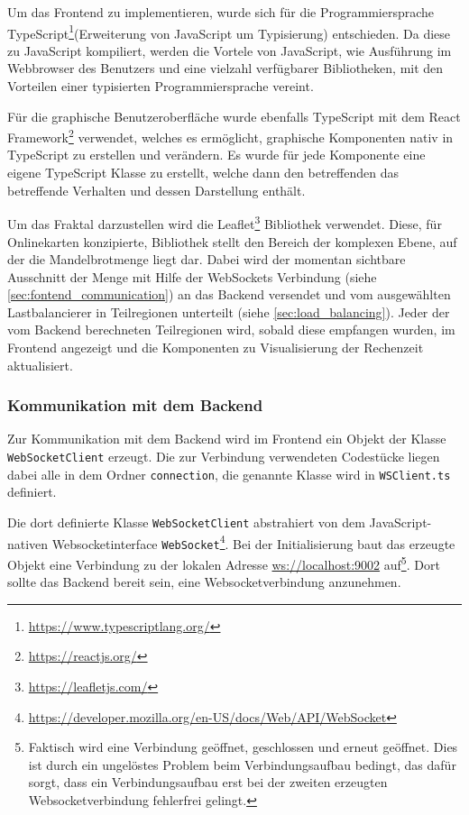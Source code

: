 Um das Frontend zu implementieren, wurde sich für die Programmiersprache TypeScript\footnote{\url{https://www.typescriptlang.org/}}(Erweiterung von JavaScript um Typisierung) entschieden.
Da diese zu JavaScript kompiliert, werden die Vortele von JavaScript, wie Ausführung im Webbrowser des Benutzers und eine vielzahl verfügbarer Bibliotheken,
mit den Vorteilen einer typisierten Programmiersprache vereint.

Für die graphische Benutzeroberfläche wurde ebenfalls TypeScript mit dem React Framework\footnote{\url{https://reactjs.org/}} verwendet, welches es ermöglicht,
graphische Komponenten nativ in TypeScript zu erstellen und verändern.
Es wurde für jede Komponente eine eigene TypeScript Klasse zu erstellt, welche dann den betreffenden
das betreffende Verhalten und dessen Darstellung enthält.

Um das Fraktal darzustellen wird die Leaflet\footnote{\url{https://leafletjs.com/}} Bibliothek verwendet.
Diese, für Onlinekarten konzipierte, Bibliothek stellt den Bereich der komplexen Ebene, auf der die Mandelbrotmenge liegt dar.
Dabei wird der momentan sichtbare Ausschnitt der Menge mit Hilfe der WebSockets Verbindung (siehe \autoref{sec:fontend_communication}) an das Backend versendet und vom ausgewählten Lastbalancierer in Teilregionen unterteilt (siehe \autoref{sec:load_balancing}).
Jeder der vom Backend berechneten Teilregionen wird, sobald diese empfangen wurden, im Frontend angezeigt und die Komponenten
zu Visualisierung der Rechenzeit aktualisiert.

\subsubsection{Kommunikation mit dem Backend}\label{sec:fontend_communication}

Zur Kommunikation mit dem Backend wird im Frontend ein Objekt der Klasse \texttt{WebSocketClient} erzeugt.
Die zur Verbindung verwendeten Codestücke liegen dabei alle in dem Ordner \verb|connection|, die genannte Klasse wird in
\verb|WSClient.ts| definiert.

Die dort definierte Klasse \verb|WebSocketClient| abstrahiert von dem JavaScript-nativen Websocketinterface \verb|WebSocket|\footnote{\url{https://developer.mozilla.org/en-US/docs/Web/API/WebSocket}}.
Bei der Initialisierung baut das erzeugte Objekt eine Verbindung zu der lokalen Adresse \url{ws://localhost:9002} auf\footnote{
	Faktisch wird eine Verbindung geöffnet, geschlossen und erneut geöffnet.
	Dies ist durch ein ungelöstes Problem beim Verbindungsaufbau bedingt, das dafür sorgt, dass ein Verbindungsaufbau
	erst bei der zweiten erzeugten Websocketverbindung fehlerfrei gelingt.
}.
Dort sollte das Backend bereit sein, eine Websocketverbindung anzunehmen.

